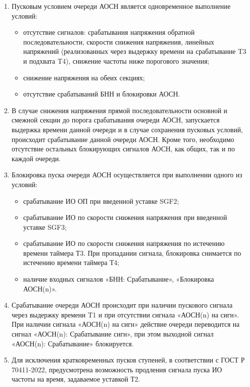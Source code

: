 \begin{enumerate}
\begin{enumerate}
\item
Пусковым условием очереди АОСН является одновременное выполнение условий:
\begin{itemize}
    \item отсутствие сигналов: срабатывания напряжения обратной последовательности, скорости снижения напряжения, линейных напряжений (реализованных через выдержку времени на срабатывание T3 и подхвата T4), снижение частоты ниже порогового значения;
    \item снижение напряжения на обеих секциях;
    \item отсутствие срабатываний БНН и блокировки АОСН.
\end{itemize}

\item
В случае снижения напряжения прямой последовательности основной и смежной секции до порога срабатывания очереди АОСН, запускается выдержка времени данной очереди и в случае сохранения пусковых условий, происходит срабатывание данной очереди АОСН. Кроме того, необходимо отсутствие остальных блокирующих сигналов АОСН, как общих, так и по каждой очереди.

\item
Блокировка пуска очереди АОСН осуществляется при выполнении одного из условий:
\begin{itemize}
    \item срабатывание ИО ОП при введенной уставке SGF2;
    \item срабатывание ИО по скорости снижения напряжения при введенной уставке SGF3;
    \item срабатывание ИО по скорости снижения напряжения по истечению времени таймера Т3. При пропадании сигнала, блокировка снимается по истечению времени таймера Т4;
    \item наличие входных сигналов «БНН: Срабатывание», «Блокировка АОСН(n)».
\end{itemize}

\item
Срабатывание очереди АОСН происходит при наличии пускового сигнала через выдержку времени T1 и при отсутствии сигнала «АОСН(n) на сигн». При наличии сигнала «АОСН(n) на сигн» действие очереди переводится на сигнал «АОСН(n): Срабатывание сигн», при этом выходной сигнал «АОСН(n): Срабатывание» блокируется.
\item
Для исключения кратковременных пусков ступеней, в соответствии с ГОСТ Р 70411-2022, предусмотрена возможность продления сигнала пуска ИО частоты на время, задаваемое уставкой Т2.


\end{enumerate}
\end{enumerate}
